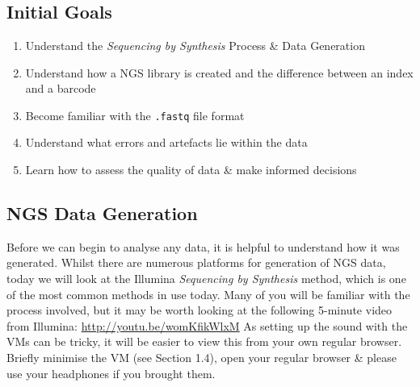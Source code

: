 
\chapter{\moduleTitle}
\newpage

\section{Initial Goals}

\begin{enumerate}
\item Understand the \textit{Sequencing by Synthesis} Process \& Data Generation \\
\item Understand how a NGS library is created and the difference between an index and a barcode \\
\item Become familiar with the \texttt{.fastq} file format\\
\item Understand what errors and artefacts lie within the data \\
\item Learn how to assess the quality of data \& make informed decisions \\
\end{enumerate}

\section{NGS Data Generation}
\begin{steps}
Before we can begin to analyse any data, it is helpful to understand how it was generated.
Whilst there are numerous platforms for generation of NGS data, today we will look at the Illumina \textit{Sequencing by Synthesis} method, which is one of the most common methods in use today.
Many of you will be familiar with the process involved, but it may be worth looking at the following 5-minute video from Illumina: \url{http://youtu.be/womKfikWlxM}
As setting up the sound with the VMs can be tricky, it will be easier to view this from your own regular browser.
Briefly minimise the VM (see Section 1.4), open your regular browser \& please use your headphones if you brought them. \\
\end{steps}

